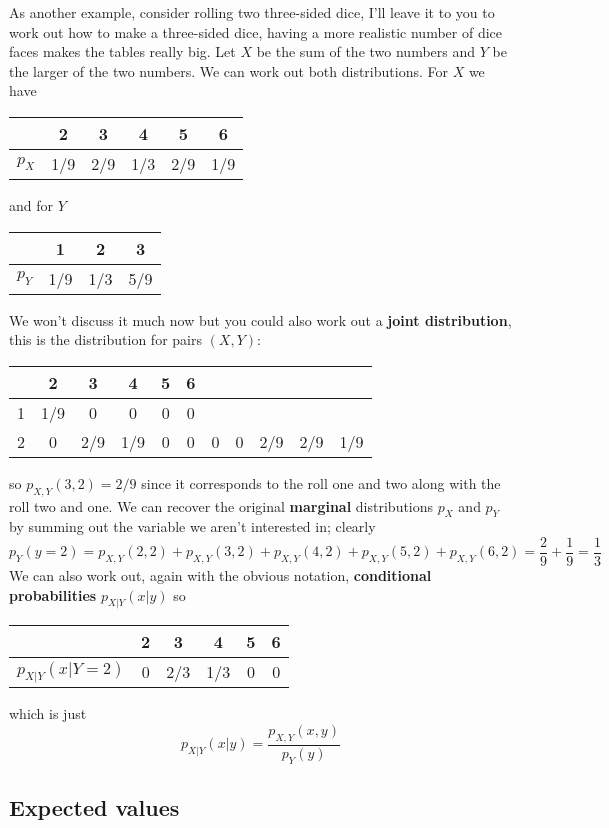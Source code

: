 \documentclass[11pt,a4paper]{scrartcl}
\begin{document}
As another example, consider rolling two three-sided dice, I'll leave
it to you to work out how to make a three-sided dice, having a more
realistic number of dice faces makes the tables really big. Let $X$ be
the sum of the two numbers and $Y$ be the larger of the two
numbers. We can work out both distributions. For $X$ we have
\begin{center}
\begin{tabular}{c|ccccc}
&2&3&4&5&6\\
\hline
$p_X$&1/9&2/9&1/3&2/9&1/9
\end{tabular}
\end{center}
and for $Y$
\begin{center}
\begin{tabular}{c|ccc}
&1&2&3\\
\hline
$p_Y$&1/9&1/3&5/9
\end{tabular}
\end{center}
We won't discuss it much now but you could also work out a
\textbf{joint distribution}, this is the distribution for pairs
$(X,Y)$:
\begin{center}
\begin{tabular}{c|ccccc}
&2&3&4&5&6\\
&  1/9&0&0&0&0\\
2&  0&2/9&1/9&0&0&  0&0&2/9&2/9&1/9
\end{tabular}
\end{center}
so $p_{X,Y}(3,2)=2/9$ since it corresponds to the roll one and two
along with the roll two and one. We can recover the original
\textbf{marginal} distributions $p_X$ and $p_Y$ by summing out the
variable we aren't interested in; clearly
\begin{equation}
p_Y(y=2)=p_{X,Y}(2,2)+p_{X,Y}(3,2)+p_{X,Y}(4,2)+p_{X,Y}(5,2)+p_{X,Y}(6,2)=\frac{2}{9}+\frac{1}{9}=\frac{1}{3}
\end{equation}
We can also work out, again with the obvious notation,
\textbf{conditional probabilities} $p_{X|Y}(x|y)$ so
\begin{center}
\begin{tabular}{c|ccccc}
&2&3&4&5&6\\
\hline
$p_{X|Y}(x|Y=2)$&0&2/3&1/3&0&0
\end{tabular}
\end{center}
which is just
\begin{equation}
p_{X|Y}(x|y)=\frac{p_{X,Y}(x,y)}{p_Y(y)}
\end{equation}

\subsection*{Expected values}
\end{document}
